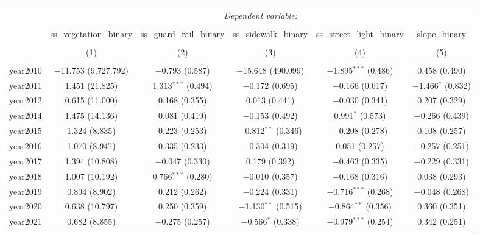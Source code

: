 
\begin{table}[!htbp] \centering 
  \caption{} 
  \label{} 
\small 
\begin{tabular}{@{\extracolsep{1pt}}lccccc} 
\\[-1.8ex]\hline 
\hline \\[-1.8ex] 
 & \multicolumn{5}{c}{\textit{Dependent variable:}} \\ 
\cline{2-6} 
\\[-1.8ex] & ss\_vegetation\_binary & ss\_guard\_rail\_binary & ss\_sidewalk\_binary & ss\_street\_light\_binary & slope\_binary \\ 
\\[-1.8ex] & (1) & (2) & (3) & (4) & (5)\\ 
\hline \\[-1.8ex] 
 year2010 & $-$11.753 (9,727.792) & $-$0.793 (0.587) & $-$15.648 (490.099) & $-$1.895$^{***}$ (0.486) & 0.458 (0.490) \\ 
  year2011 & 1.451 (21.825) & 1.313$^{***}$ (0.494) & $-$0.172 (0.695) & $-$0.166 (0.617) & $-$1.466$^{*}$ (0.832) \\ 
  year2012 & 0.615 (11.000) & 0.168 (0.355) & 0.013 (0.441) & $-$0.030 (0.341) & 0.207 (0.329) \\ 
  year2014 & 1.475 (14.136) & 0.081 (0.419) & $-$0.153 (0.492) & 0.991$^{*}$ (0.573) & $-$0.266 (0.439) \\ 
  year2015 & 1.324 (8.835) & 0.223 (0.253) & $-$0.812$^{**}$ (0.346) & $-$0.208 (0.278) & 0.108 (0.257) \\ 
  year2016 & 1.070 (8.947) & 0.335 (0.233) & $-$0.304 (0.319) & 0.051 (0.257) & $-$0.257 (0.251) \\ 
  year2017 & 1.394 (10.808) & $-$0.047 (0.330) & 0.179 (0.392) & $-$0.463 (0.335) & $-$0.229 (0.331) \\ 
  year2018 & 1.007 (10.192) & 0.766$^{***}$ (0.280) & $-$0.010 (0.357) & $-$0.168 (0.316) & 0.038 (0.293) \\ 
  year2019 & 0.894 (8.902) & 0.212 (0.262) & $-$0.224 (0.331) & $-$0.716$^{***}$ (0.268) & $-$0.048 (0.268) \\ 
  year2020 & 0.638 (10.797) & 0.250 (0.359) & $-$1.130$^{**}$ (0.515) & $-$0.864$^{**}$ (0.356) & 0.360 (0.351) \\ 
  year2021 & 0.682 (8.855) & $-$0.275 (0.257) & $-$0.566$^{*}$ (0.338) & $-$0.979$^{***}$ (0.254) & 0.342 (0.251) \\ 

\end{tabular}
\end{table}
